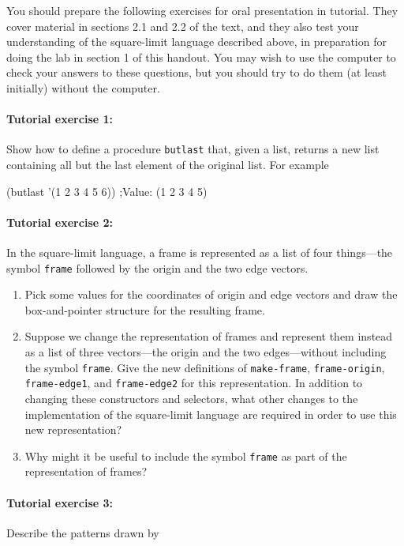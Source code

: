 You should prepare the following exercises for oral presentation in
tutorial.  They cover material in sections 2.1 and 2.2 of the text,
and they also test your understanding of the square-limit language
described above, in preparation for doing the lab in section 1 of
this handout.  You may wish to use the computer to check your answers
to these questions, but you should try to do them (at least
initially) without the computer.

\paragraph{Tutorial exercise 1:}
Show how to define a procedure {\tt butlast} that, given a list,
returns a new list containing all but the last element of the original
list.  For example

\beginlisp
(butlast '(1 2 3 4 5 6))
;Value: (1 2 3 4 5)
\endlisp

\paragraph{Tutorial exercise 2:}
In the square-limit language, a frame is represented as a list of four
things---the symbol {\tt frame} followed by the origin and the two
edge vectors.

\begin{enumerate}

\item Pick some values for the coordinates of origin and edge vectors
and draw the box-and-pointer structure for the resulting frame.

\item Suppose we change the representation of frames and represent
them instead as a list of three vectors---the origin and the two
edges---without including the symbol {\tt frame}.  Give the new
definitions of {\tt make-frame}, {\tt frame-origin}, {\tt
frame-edge1}, and {\tt frame-edge2} for this representation.  In
addition to changing these constructors and selectors, what other
changes to the implementation of the square-limit language are
required in order to use this new representation?

\item Why might it be useful to include the symbol {\tt frame} as part
of the representation of frames?
\end{enumerate}

\paragraph{Tutorial exercise 3:}
Describe the patterns drawn by

